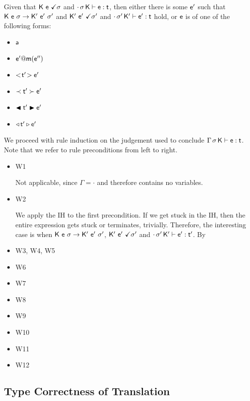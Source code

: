 \documentclass[a4paper,USenglish]{tex/lipics-v2016}
\begin{document}
Given that $\WFp\K\e\s$ and $\EnvType\cdot\s\K\e\t$, then either there is some $\ep$ such that $\Reduce \K\e\s \Kp\ep\sp$ and $\WFp\Kp\ep\sp$ and $\EnvType\cdot\sp\Kp\ep\t$ hold, or $\e$ is of one of the following forms:
\begin{itemize} 
\item $\a$
\item $\DynCall\ep\m{\epp}$
\item $\SubCast\tp\ep$
\item $\ShaCast\tp\ep$
\item $\BehCast\tp\ep$
\item $\MonCast\tp\ep $
\end{itemize}
We proceed with rule induction on the judgement used to conclude $\EnvType\Env\s\K\e\t$. Note that we refer to rule preconditions from left to right.
\begin{itemize}
  \item W1

        Not applicable, since $\Gamma = \cdot$ and therefore contains no variables.
  \item W2

        We apply the IH to the first precondition. If we get stuck in the IH, then the entire expression gets stuck or terminates, trivially. Therefore, the interesting case is when $\Reduce \K\e\s \Kp\ep\sp$, $\WFp\Kp\ep\sp$ and $\EnvType\cdot\sp\Kp\ep\tp$. By 
  \item W3, W4, W5
  \item W6
  \item W7
  \item W8
  \item W9
  \item W10
  \item W11
  \item W12
\end{itemize}

\subsection{Type Correctness of Translation}
\end{document}

